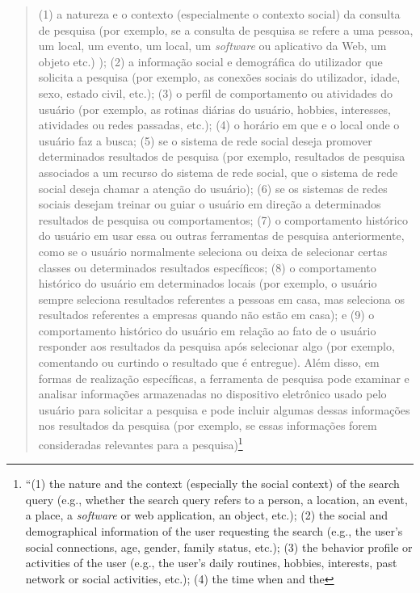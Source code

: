 \begin{quote}
(1) a natureza e o contexto (especialmente o contexto social) da
consulta de pesquisa (por exemplo, se a consulta de pesquisa se refere a
uma pessoa, um local, um evento, um local, um \emph{software} ou aplicativo da
Web, um objeto etc.) ); (2) a informação social e demográfica do
utilizador que solicita a pesquisa (por exemplo, as conexões sociais do
utilizador, idade, sexo, estado civil, etc.); (3) o perfil de
comportamento ou atividades do usuário (por exemplo, as rotinas diárias
do usuário, hobbies, interesses, atividades ou redes passadas, etc.);
(4) o horário em que e o local onde o usuário faz a busca; (5) se o
sistema de rede social deseja promover determinados resultados de
pesquisa (por exemplo, resultados de pesquisa associados a um recurso do
sistema de rede social, que o sistema de rede social deseja chamar a
atenção do usuário); (6) se os sistemas de redes sociais desejam treinar
ou guiar o usuário em direção a determinados resultados de pesquisa ou
comportamentos; (7) o comportamento histórico do usuário em usar essa ou
outras ferramentas de pesquisa anteriormente, como se o usuário
normalmente seleciona ou deixa de selecionar certas classes ou
determinados resultados específicos; (8) o comportamento histórico do
usuário em determinados locais (por exemplo, o usuário sempre seleciona
resultados referentes a pessoas em casa, mas seleciona os resultados
referentes a empresas quando não estão em casa); e (9) o comportamento
histórico do usuário em relação ao fato de o usuário responder aos
resultados da pesquisa após selecionar algo (por exemplo, comentando ou
curtindo o resultado que é entregue). Além disso, em formas de
realização específicas, a ferramenta de pesquisa pode examinar e
analisar informações armazenadas no dispositivo eletrônico usado pelo
usuário para solicitar a pesquisa e pode incluir algumas dessas
informações nos resultados da pesquisa (por exemplo, se essas
informações forem consideradas relevantes para a pesquisa)\footnote{``(1)
  the nature and the context (especially the social context) of the
  search query (e.g., whether the search query refers to a person, a
  location, an event, a place, a \emph{software} or web application, an object,
  etc.); (2) the social and demographical information of the user
  requesting the search (e.g., the user's social connections, age,
  gender, family status, etc.); (3) the behavior profile or activities
  of the user (e.g., the user's daily routines, hobbies, interests, past
  network or social activities, etc.); (4) the time when and the
}
\end{quote}
